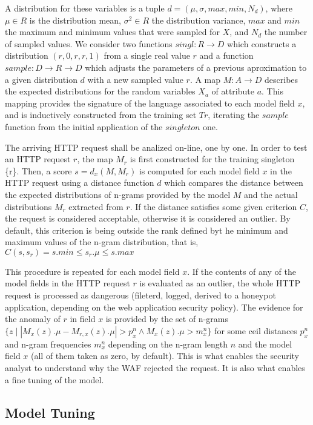 \documentclass[runningheads,a4paper]{llncs}
\begin{document}
A distribution for these variables is a tuple $d=(\mu, \sigma, max, min, N_d)$, where $\mu \in R$ is the distribution mean, $\sigma^2 \in R$ the distribution variance, $max$ and $min$ the maximum and minimum values that were sampled for $X$, and $N_d$ the number of sampled values. We consider two functions $singl : R \rightarrow D$ which constructs a distribution $(r,0,r,r,1)$ from a single real value $r$ and a function $sample: D \rightarrow R \rightarrow D$ which adjusts the parameters of a previous aproximation to a given distribution $d$ with a new sampled value $r$. A map $M : A \rightarrow D$ describes the expected distributions for the random variables $X_a$ of attribute $a$. This mapping provides the signature of the language associated to each model field $x$, and is inductively constructed from the training set $Tr$, iterating the $sample$ function from the initial application of the $singleton$ one.

The arriving HTTP request shall be analized on-line, one by one. In order to test an HTTP request $r$, the map $M_r$ is first constructed for the training singleton \{r\}. Then, a score $s=d_x(M,M_r)$ is computed for each model field $x$ in the HTTP request using a distance function $d$ which compares the distance between the expected distributions of n-grams provided by the model $M$ and the actual distributions $M_r$ extracted from $r$. If the distance satisfies some given criterion $C$, the request is considered acceptable, otherwise it is considered an outlier. By default, this criterion is being outside the rank defined byt he minimum and maximum values of the n-gram distribution, that is,  $C(s,s_r) = s.min \leq s_r.\mu \leq s.max$

This procedure is repeated for each model field $x$. If the contents of any of the model fields in the HTTP request $r$ is evaluated as an outlier, the whole HTTP request is processed as dangerous (fileterd, logged, derived to a honeypot application, depending on the web application security policy). The evidence for the anomaly of $r$ in field $x$ is provided by the set of n-grams $\{ z \mid  |M_x(z).\mu - M_{r,x}(z).\mu | > p^n_x \land M_x(z).\mu > m^n_x\}$ for some ceil distances $p^n_x$ and n-gram frequencies $m^n_x$ depending on the n-gram length $n$ and the model field $x$ (all of them taken as zero, by default). This is what enables the security analyst to understand why the WAF rejected the request. It is also what enables a fine tuning of the model.

\subsection{Model Tuning}
\end{document}
